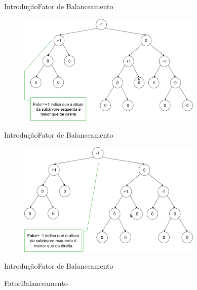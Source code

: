 \documentclass[aspectratio=169]{beamer}
\begin{document}

\begin{frame}{Introdução}{Fator de Balanceamento}
\begin{figure}[!h]
  \centering
   \includegraphics[width=250pt]{imagens/fator_balanceamento2.png}
  \label{fig_fator_balanceamento2}
\end{figure}
\end{frame}


\begin{frame}{Introdução}{Fator de Balanceamento}
\begin{figure}[!h]
  \centering
   \includegraphics[width=250pt]{imagens/fator_balanceamento3.png}
  \label{fig_fator_balanceamento3}
\end{figure}
\end{frame}


\begin{frame}{Introdução}{Fator de Balanceamento}
\begin{algorithm}[H]
\caption{FatorBalanceamento} 
\label{FatorBalanceamento}
\end{algorithm}
\end{frame}
\end{document}
